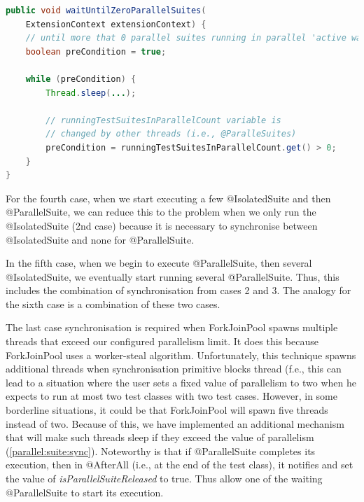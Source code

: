 \begin{lstlisting}[language=Java,label=parallelsuite:isolatedsuite:sync,caption=@ParallelSuite and @IsolatedSuite synchronisation mechanism,frame=tb]
public void waitUntilZeroParallelSuites(
    ExtensionContext extensionContext) {
    // until more that 0 parallel suites running in parallel 'active waiting'
    boolean preCondition = true;

    while (preCondition) {
        Thread.sleep(...);

        // runningTestSuitesInParallelCount variable is
        // changed by other threads (i.e., @ParalleSuites)
        preCondition = runningTestSuitesInParallelCount.get() > 0;
    }
}
\end{lstlisting}

For the fourth case, when we start executing a few @IsolatedSuite and then @ParallelSuite, we can reduce this to the
problem when we only run the @IsolatedSuite (2nd case) because it is necessary to synchronise between @IsolatedSuite
and none for @ParallelSuite.

In the fifth case, when we begin to execute @ParallelSuite, then several @IsolatedSuite, we eventually start running several
@ParallelSuite. Thus, this includes the combination of synchronisation from cases 2 and 3.
The analogy for the sixth case is a combination of these two cases.

The last case synchronisation is required when ForkJoinPool spawns multiple threads that exceed our configured parallelism limit.
It does this because ForkJoinPool uses a worker-steal algorithm. Unfortunately, this technique spawns additional threads when
synchronisation primitive blocks thread (f.e., this can lead to a situation where the user sets a fixed value of parallelism
to two when he expects to run at most two test classes with two test cases. However, in some borderline situations,
it could be that ForkJoinPool will spawn five threads instead of two. Because of this, we have implemented an additional
mechanism that will make such threads sleep if they exceed the value of parallelism (\ref{parallel:suite:sync}).
Noteworthy is that if @ParallelSuite completes its execution, then in @AfterAll (i.e., at the end of the test class),
it notifies and set the value of \emph{isParallelSuiteReleased} to true. Thus allow one of the waiting @ParallelSuite to start its execution.

